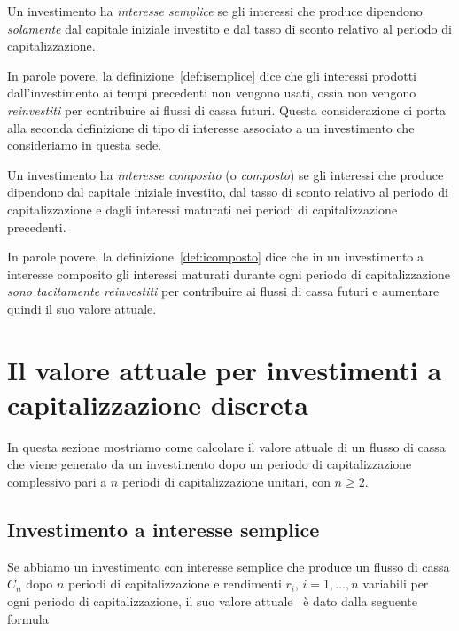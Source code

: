 \begin{defn}\label{def:isemplice}
  Un investimento ha \emph{interesse semplice} se gli interessi che produce dipendono \emph{solamente}
  dal capitale iniziale investito e dal tasso di sconto relativo al periodo di capitalizzazione.
\end{defn}

In parole povere, la definizione~\ref{def:isemplice} dice che gli interessi prodotti dall'investimento ai tempi
precedenti non vengono usati, ossia non vengono \emph{reinvestiti} per contribuire ai flussi di cassa futuri.
Questa considerazione ci porta alla seconda definizione di tipo di interesse associato a un investimento
che consideriamo in questa sede.

\begin{defn} \label{def:icomposto}
  Un investimento ha \emph{interesse composito} (o \emph{composto}) se gli interessi che produce dipendono
  dal capitale iniziale investito, dal tasso di sconto relativo al periodo di capitalizzazione e dagli interessi
  maturati nei periodi di capitalizzazione precedenti. 
\end{defn}

In parole povere, la definizione~\ref{def:icomposto} dice che in un investimento a interesse composito gli interessi
maturati durante ogni periodo di capitalizzazione \emph{sono tacitamente reinvestiti} per contribuire ai flussi di cassa
futuri e aumentare quindi il suo valore attuale.

\section[Capitalizzazione discreta]{Il valore attuale per investimenti a capitalizzazione discreta}
\label{sec:tdiscreti}

In questa sezione mostriamo come calcolare il valore attuale di un flusso di cassa che viene generato da un investimento 
dopo un periodo di capitalizzazione complessivo pari a $n$ periodi di capitalizzazione unitari, con $n\ge 2$.

\subsection{Investimento a interesse semplice}
\label{sec:isemplice_td}

Se abbiamo un investimento con interesse semplice che produce un flusso di cassa $C_n$ dopo $n$ periodi di capitalizzazione
e rendimenti $r_i$, $i= 1, \ldots, n$ variabili per ogni periodo di capitalizzazione, il suo valore attuale \VA\ è dato dalla
seguente formula

